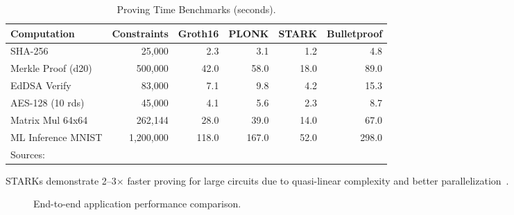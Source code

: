 \documentclass[sigconf,nonacm]{acmart}
\begin{document}
\begin{table}[t]
\caption{Proving Time Benchmarks (seconds).}
\label{tab:proving_benchmarks}
\small
\setlength{\tabcolsep}{5pt}
\begin{tabularx}{\textwidth}{@{}Xrrrrr@{}}
\toprule
\textbf{Computation} & \textbf{Constraints} & \textbf{Groth16} &
\textbf{PLONK} & \textbf{STARK} & \textbf{Bulletproof} \\
\midrule
SHA-256            &     25,000 &   2.3 &   3.1 &   1.2 &   4.8 \\
Merkle Proof (d20) &    500,000 &  42.0 &  58.0 &  18.0 &  89.0 \\
EdDSA Verify       &     83,000 &   7.1 &   9.8 &   4.2 &  15.3 \\
AES-128 (10 rds)   &     45,000 &   4.1 &   5.6 &   2.3 &   8.7 \\
Matrix Mul 64x64   &    262,144 &  28.0 &  39.0 &  14.0 &  67.0 \\
ML Inference MNIST & 1,200,000  & 118.0 & 167.0 &  52.0 & 298.0 \\
\bottomrule
\multicolumn{6}{l}{\footnotesize Sources:~\cite{crypto_benchmarks_2024,proving_comparison_2025}} \\
\end{tabularx}
\end{table}

STARKs demonstrate 2--3$\times$ faster proving for large circuits due to quasi-linear
complexity and better parallelization~\cite{stark_efficiency_2024}.

\begin{figure}[h]
\centering
{}
\caption{End-to-end application performance comparison.}
\label{fig:application_performance}
\end{figure}
\end{document}
